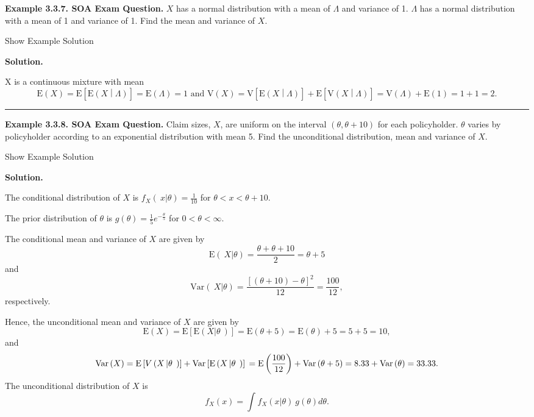 \documentclass[]{book}
\theoremstyle{definition}
\theoremstyle{definition}
\theoremstyle{definition}
\theoremstyle{remark}
\begin{document}
\textbf{Example 3.3.7. SOA Exam Question.} \(X\) has a normal
distribution with a mean of \(\Lambda\) and variance of 1. \(\Lambda\)
has a normal distribution with a mean of 1 and variance of 1. Find the
mean and variance of \(X\).

Show Example Solution

\hypertarget{toggleExampleLoss.3.7}{}
\textbf{Solution.}

X is a continuous mixture with mean
\[\mathrm{E}\left(X\right)=\mathrm{E}\left[\mathrm{E}\left(X\middle|\Lambda\right)\right]=\mathrm{E}\left(\Lambda\right)=1 \text{ and } \mathrm{V}\left(X\right)=\mathrm{V}\left[\mathrm{E}\left(X\middle|\Lambda\right)\right]+\mathrm{E}\left[\mathrm{V}\left(X\middle|\Lambda\right)\right]=\mathrm{V}\left(\Lambda\right)+\mathrm{E}\left(1\right)=1+1=2.\]

\begin{center}\rule{0.5\linewidth}{\linethickness}\end{center}

\textbf{Example 3.3.8. SOA Exam Question.} Claim sizes, \(X\), are
uniform on the interval \(\left(\theta,\theta+10\right)\) for each
policyholder. \(\theta\) varies by policyholder according to an
exponential distribution with mean 5. Find the unconditional
distribution, mean and variance of \(X\).

Show Example Solution

\hypertarget{toggleExampleLoss.3.8}{}
\textbf{Solution.}

The conditional distribution of \(X\) is
\(f_{X}\left( \left. \ x \right|\theta \right) = \frac{1}{10}\) for
\(\theta < x < \theta + 10\).

The prior distribution of \(\theta\) is
\(g\left( \theta \right) = \frac{1}{5}e^{- \frac{\theta}{5}}\) for
\(0 < \theta < \infty\).

The conditional mean and variance of \(X\) are given by
\[\mathrm{E}\left( \left. \ X \right|\theta \right) = \frac{\theta + \theta + 10}{2} = \theta + 5\]
and
\[\mathrm{Var}\left( \left. \ X \right|\theta \right) = \frac{\left\lbrack \left( \theta + 10 \right) - \theta \right\rbrack^{2}}{12} = \frac{100}{12}, \]
respectively.

Hence, the unconditional mean and variance of \(X\) are given by
\[\mathrm{E}\left( X \right) = \mathrm{E}\left\lbrack \mathrm{E}\left( X\left| \theta \right.\  \right) \right\rbrack = \mathrm{E}\left( \theta + 5 \right) = \mathrm{E}\left( \theta \right) + 5 = 5 + 5 = 10,\]
and
\[\mathrm{Var}\left( X \right) = \mathrm{E}\left\lbrack V\left( X\left| \theta \right.\  \right) \right\rbrack + \mathrm{Var}\left\lbrack \mathrm{E}\left( X\left| \theta \right.\  \right) \right\rbrack \\
= \mathrm{E}\left( \frac{100}{12} \right) + \mathrm{Var}\left( \theta + 5 \right) = 8.33 + \mathrm{Var}\left( \theta \right) = 33.33. \]
The unconditional distribution of \(X\) is
\[f_{X}\left( x \right) = \int_{}^{}{f_{X}\left( x |\theta \right) ~g\left( \theta \right) d \theta} .\]
\end{document}
